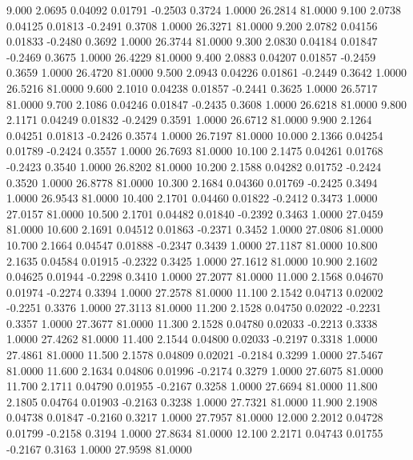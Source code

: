    9.000   2.0695   0.04092   0.01791  -0.2503   0.3724   1.0000  26.2814  81.0000
   9.100   2.0738   0.04125   0.01813  -0.2491   0.3708   1.0000  26.3271  81.0000
   9.200   2.0782   0.04156   0.01833  -0.2480   0.3692   1.0000  26.3744  81.0000
   9.300   2.0830   0.04184   0.01847  -0.2469   0.3675   1.0000  26.4229  81.0000
   9.400   2.0883   0.04207   0.01857  -0.2459   0.3659   1.0000  26.4720  81.0000
   9.500   2.0943   0.04226   0.01861  -0.2449   0.3642   1.0000  26.5216  81.0000
   9.600   2.1010   0.04238   0.01857  -0.2441   0.3625   1.0000  26.5717  81.0000
   9.700   2.1086   0.04246   0.01847  -0.2435   0.3608   1.0000  26.6218  81.0000
   9.800   2.1171   0.04249   0.01832  -0.2429   0.3591   1.0000  26.6712  81.0000
   9.900   2.1264   0.04251   0.01813  -0.2426   0.3574   1.0000  26.7197  81.0000
  10.000   2.1366   0.04254   0.01789  -0.2424   0.3557   1.0000  26.7693  81.0000
  10.100   2.1475   0.04261   0.01768  -0.2423   0.3540   1.0000  26.8202  81.0000
  10.200   2.1588   0.04282   0.01752  -0.2424   0.3520   1.0000  26.8778  81.0000
  10.300   2.1684   0.04360   0.01769  -0.2425   0.3494   1.0000  26.9543  81.0000
  10.400   2.1701   0.04460   0.01822  -0.2412   0.3473   1.0000  27.0157  81.0000
  10.500   2.1701   0.04482   0.01840  -0.2392   0.3463   1.0000  27.0459  81.0000
  10.600   2.1691   0.04512   0.01863  -0.2371   0.3452   1.0000  27.0806  81.0000
  10.700   2.1664   0.04547   0.01888  -0.2347   0.3439   1.0000  27.1187  81.0000
  10.800   2.1635   0.04584   0.01915  -0.2322   0.3425   1.0000  27.1612  81.0000
  10.900   2.1602   0.04625   0.01944  -0.2298   0.3410   1.0000  27.2077  81.0000
  11.000   2.1568   0.04670   0.01974  -0.2274   0.3394   1.0000  27.2578  81.0000
  11.100   2.1542   0.04713   0.02002  -0.2251   0.3376   1.0000  27.3113  81.0000
  11.200   2.1528   0.04750   0.02022  -0.2231   0.3357   1.0000  27.3677  81.0000
  11.300   2.1528   0.04780   0.02033  -0.2213   0.3338   1.0000  27.4262  81.0000
  11.400   2.1544   0.04800   0.02033  -0.2197   0.3318   1.0000  27.4861  81.0000
  11.500   2.1578   0.04809   0.02021  -0.2184   0.3299   1.0000  27.5467  81.0000
  11.600   2.1634   0.04806   0.01996  -0.2174   0.3279   1.0000  27.6075  81.0000
  11.700   2.1711   0.04790   0.01955  -0.2167   0.3258   1.0000  27.6694  81.0000
  11.800   2.1805   0.04764   0.01903  -0.2163   0.3238   1.0000  27.7321  81.0000
  11.900   2.1908   0.04738   0.01847  -0.2160   0.3217   1.0000  27.7957  81.0000
  12.000   2.2012   0.04728   0.01799  -0.2158   0.3194   1.0000  27.8634  81.0000
  12.100   2.2171   0.04743   0.01755  -0.2167   0.3163   1.0000  27.9598  81.0000
